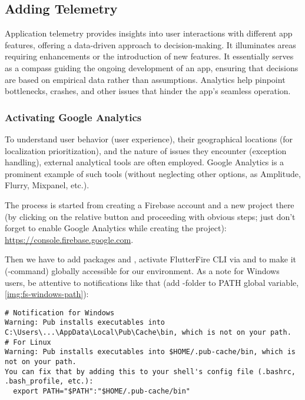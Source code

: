 
\subsection{Adding Telemetry} \label{telemetry}

Application telemetry provides insights into user interactions with different app features, offering a data-driven 
approach to decision-making. It illuminates areas requiring enhancements or the introduction of new features. It 
essentially serves as a compass guiding the ongoing development of an app, ensuring that decisions are based on 
empirical data rather than assumptions. Analytics help pinpoint bottlenecks, crashes, and other issues that hinder the 
app's seamless operation. 


\subsubsection{Activating Google Analytics}

To understand user behavior (user experience), their geographical locations (for localization prioritization), and the 
nature of issues they encounter (exception handling), external analytical tools are often employed. Google Analytics 
is a prominent example of such tools (without neglecting other options, as Amplitude, Flurry, Mixpanel, etc.).

The process is started from creating a Firebase account and a new project there (by clicking on the relative 
button and proceeding with obvious steps; just don't forget to enable Google Analytics while creating the project): 
\href{https://console.firebase.google.com}{https://console.firebase.google.com}.

Then we have to add packages  and , activate 
FlutterFire CLI  via  and  to make it 
(-command) globally accessible for our environment. As a note for Windows users, be attentive to 
notifications like that (add -folder to PATH global variable, \cref{img:fs-windows-path}):

\begin{lstlisting}[language=terminal]
# Notification for Windows
Warning: Pub installs executables into C:\Users\...\AppData\Local\Pub\Cache\bin, which is not on your path.
# For Linux
Warning: Pub installs executables into $HOME/.pub-cache/bin, which is not on your path.
You can fix that by adding this to your shell's config file (.bashrc, .bash_profile, etc.):
  export PATH="$PATH":"$HOME/.pub-cache/bin"
\end{lstlisting}

